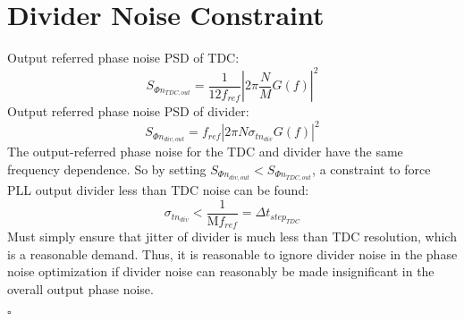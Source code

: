 	\section{Divider Noise Constraint}\label{div_noise_constraint}
		Output referred phase noise PSD of TDC:
		\begin{equation}
			S_{\Phi n_{TDC,out}} = \frac{1}{12 f_{ref}}\left|2\pi\frac{N}{M} G(f) \right|^2
		\end{equation}
		Output referred phase noise PSD of divider:
		\begin{equation}
			S_{\Phi n_{div, out}} = f_{ref} \left|2\pi N \sigma_{tn_{div}} G(f)\right|^2
		\end{equation}
		The output-referred phase noise for the TDC and divider have the same frequency dependence. So by setting $S_{\Phi n_{div, out}} < S_{\Phi n_{TDC,out}}$, a constraint to force PLL output divider less than TDC noise can be found:
		\begin{equation}
			\sigma_{tn_{div}} < \frac{1}{\mathrm{M}f_{ref}} = \Delta t_{step_{TDC}}
		\end{equation}
		Must simply ensure that jitter of divider is much less than TDC resolution, which is a reasonable demand. Thus, it is reasonable to ignore divider noise in the phase noise optimization if divider noise can reasonably be made insignificant in the overall output phase noise.

\vspace{-0.8em}\center$ \square $




